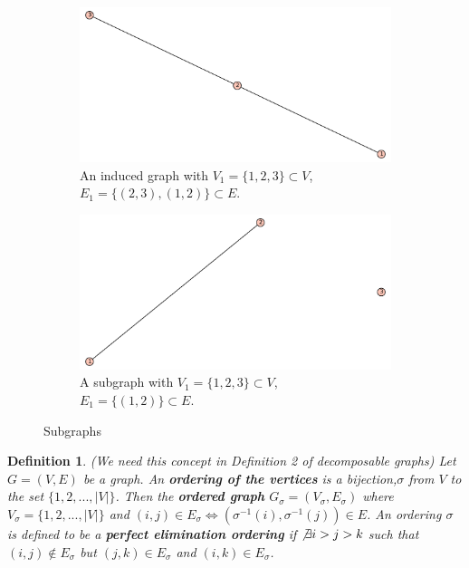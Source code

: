 \documentclass[12pt, leqno]{article}
\providecommand{\abs}[1]{\lvert#1\rvert}
\newtheorem{defn}[thm]{Definition}
\begin{document}
\begin{figure}
\centering
\begin{subfigure}{.5\textwidth}
  \centering
  \includegraphics [scale=0.3]{h05.pdf}
\caption{An induced graph with $V_1=\{1,2,3\} \subset V$, $E_1=
    \{(2,3),(1,2)\} \subset E$.}
  \label{graph4induced}
\end{subfigure}%
\begin{subfigure}{.5\textwidth}
  \centering
  \includegraphics [scale=0.3]{h04.pdf}
  \caption{A subgraph with $V_1=\{1,2,3\} \subset V$, $E_1=
    \{(1,2)\} \subset E$.}
  \label{subgraph4v}
\end{subfigure}
\caption{Subgraphs}
\label{notinducedsubgraph}
\end{figure}
\begin{defn} (We need this concept in
Definition 2 of decomposable graphs) Let $G =
(V,E)$ be a graph. An \textbf{ordering of the vertices} is a bijection,$\sigma
$ from $V$ to the set $\{1,2,...,\abs{V}\}$. Then the \textbf{ordered graph}
$G_{\sigma} = (V_{\sigma} ,E_{\sigma} )$ where $V_{\sigma} =
\{1,2,...,\abs{V}\}$ and $(i,j) \in E_{\sigma} \iff
(\sigma^{-1}(i),\sigma^{-1}(j)) \in E$. An ordering $\sigma$ is
defined to be a \textbf{perfect elimination ordering} if $\not\exists  i>j>k$
such that $(i,j) \not\in E_{\sigma}$ but $(j,k) \in  E_{\sigma}$ and
$(i,k) \in E_{\sigma}$. 
\end{defn}
\end{document}
